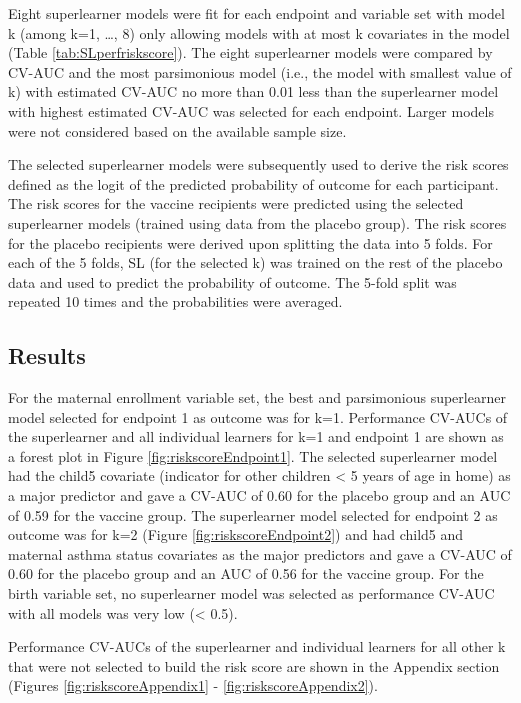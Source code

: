 \documentclass[11pt]{article}
\begin{document}
Eight superlearner models were fit for each endpoint and variable set with model k (among k=1, \ldots, 8) only allowing models with at most k covariates in the model (Table \ref{tab:SLperfriskscore}). The eight superlearner models were compared by CV-AUC and the most parsimonious model (i.e., the model with smallest value of k) with estimated CV-AUC no more than 0.01 less than the superlearner model with highest estimated CV-AUC was selected for each endpoint. Larger models were not considered based on the available sample size.

The selected superlearner models were subsequently used to derive the risk scores defined as the logit of the predicted probability of outcome for each participant. The risk scores for the vaccine recipients were predicted using the selected superlearner models (trained using data from the placebo group). The risk scores for the placebo recipients were derived upon splitting the data into 5 folds. For each of the 5 folds, SL (for the selected k) was trained on the rest of the placebo data and used to predict the probability of outcome. The 5-fold split was repeated 10 times and the probabilities were averaged.

\hypertarget{results}{%
\subsection{Results}\label{results}}

For the maternal enrollment variable set, the best and parsimonious superlearner model selected for endpoint 1 as outcome was for k=1. Performance CV-AUCs of the superlearner and all individual learners for k=1 and endpoint 1 are shown as a forest plot in Figure \ref{fig:riskscoreEndpoint1}. The selected superlearner model had the child5 covariate (indicator for other children \textless{} 5 years of age in home) as a major predictor and gave a CV-AUC of 0.60 for the placebo group and an AUC of 0.59 for the vaccine group. The superlearner model selected for endpoint 2 as outcome was for k=2 (Figure \ref{fig:riskscoreEndpoint2}) and had child5 and maternal asthma status covariates as the major predictors and gave a CV-AUC of 0.60 for the placebo group and an AUC of 0.56 for the vaccine group.
For the birth variable set, no superlearner model was selected as performance CV-AUC with all models was very low (\textless{} 0.5).

Performance CV-AUCs of the superlearner and individual learners for all other k that were not selected to build the risk score are shown in the Appendix section (Figures \ref{fig:riskscoreAppendix1} - \ref{fig:riskscoreAppendix2}).
\end{document}
